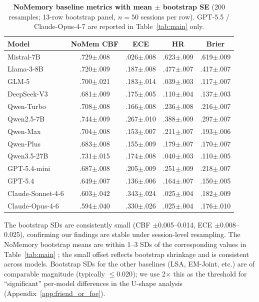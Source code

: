 \documentclass[11pt]{article}
\begin{document}
\begin{table}[h]
\centering
\small
\caption{\textbf{NoMemory baseline metrics with mean $\pm$ bootstrap SE} (200 resamples; 13-row bootstrap panel, $n{=}50$ sessions per row). GPT-5.5 / Claude-Opus-4-7 are reported in Table~\ref{tab:main} only.}
\label{tab:bootstrap_stability}
\begin{tabular}{l cccc}
\toprule
\textbf{Model} & \textbf{NoMem CBF} & \textbf{ECE} & \textbf{HR} & \textbf{Brier} \\
\midrule
Mistral-7B          & .729$\pm$.008 & .026$\pm$.008 & .623$\pm$.009 & .619$\pm$.009 \\
Llama-3-8B          & .720$\pm$.009 & .187$\pm$.008 & .477$\pm$.007 & .417$\pm$.007 \\
GLM-5               & .700$\pm$.021 & .183$\pm$.014 & .039$\pm$.003 & .117$\pm$.007 \\
DeepSeek-V3         & .681$\pm$.009 & .175$\pm$.005 & .110$\pm$.004 & .137$\pm$.003 \\
Qwen-Turbo          & .708$\pm$.008 & .166$\pm$.008 & .236$\pm$.008 & .216$\pm$.007 \\
Qwen2.5-7B          & .744$\pm$.009 & .267$\pm$.010 & .388$\pm$.009 & .297$\pm$.007 \\
Qwen-Max            & .704$\pm$.008 & .153$\pm$.007 & .211$\pm$.007 & .193$\pm$.006 \\
Qwen-Plus           & .683$\pm$.008 & .155$\pm$.009 & .179$\pm$.007 & .170$\pm$.007 \\
Qwen3.5-27B         & .731$\pm$.015 & .174$\pm$.008 & .040$\pm$.003 & .110$\pm$.005 \\
GPT-5.4-mini        & .687$\pm$.008 & .205$\pm$.009 & .251$\pm$.009 & .218$\pm$.007 \\
GPT-5.4             & .649$\pm$.007 & .136$\pm$.006 & .164$\pm$.007 & .150$\pm$.005 \\
Claude-Sonnet-4-6   & .603$\pm$.042 & .343$\pm$.024 & .025$\pm$.004 & .182$\pm$.009 \\
Claude-Opus-4-6     & .594$\pm$.040 & .330$\pm$.026 & .025$\pm$.004 & .176$\pm$.010 \\
\bottomrule
\end{tabular}
\end{table}

The bootstrap SDs are consistently small (CBF $\pm$0.005--0.014, ECE $\pm$0.008--0.025), confirming our findings are stable under session-level resampling. The NoMemory bootstrap means are within 1--3 SDs of the corresponding values in Table~\ref{tab:main} ; the small offset reflects bootstrap shrinkage and is consistent across models. Bootstrap SDs for the other baselines (LSA, EM-Joint, etc.) are of comparable magnitude (typically $\leq 0.020$); we use 2$\times$ this as the threshold for ``significant'' per-model differences in the U-shape analysis (Appendix~\ref{app:friend_or_foe}).
\end{document}
